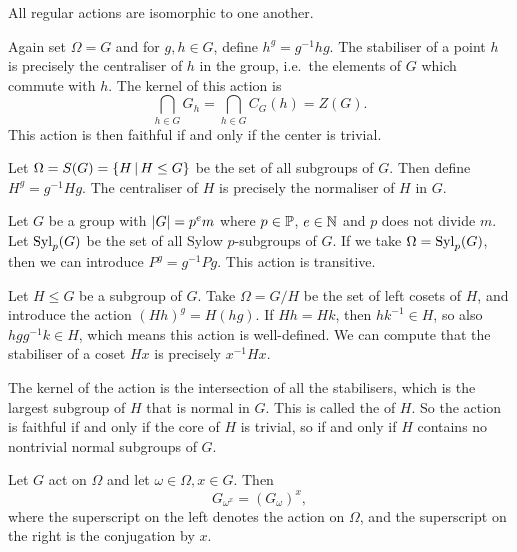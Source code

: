 \begin{remark}
  All regular actions are isomorphic to one another.
\end{remark}

\begin{example}
  Again set $\Omega = G$ and for $g, h \in G$, define $h^g = g^{-1} h g$.
  The stabiliser of a point $h$ is precisely the centraliser of $h$ in the
  group, i.e.~the elements of $G$ which commute with $h$.
  The kernel of this action is
  \[
	\bigcap_{h \in G} G_h = \bigcap_{h \in G} C_G(h) = Z(G).
  \]
  This action is then faithful if and only if the center is trivial.
\end{example}

\begin{example}
  Let $\Omega = S(G) = \{ H \,|\, H \le G \}$ be the set of all subgroups of
  $G$.
  Then define $H^g = g^{-1} H g$.
  The centraliser of $H$ is precisely the normaliser of $H$ in $G$.
\end{example}

\begin{example}
  Let $G$ be a group with $\left| G \right| = p^e m$ where $p \in \mathbb{P}$, $e \in \mathbb{N}$ and
  $p$ does not divide $m$.
  Let $\operatorname{Syl}_p(G)$ be the set of all Sylow $p$-subgroups of $G$.
  If we take $\Omega = \operatorname{Syl}_p(G)$, then we can introduce $P^g = g^{-1} P g$.
  This action is transitive.
\end{example}

\begin{example}
  Let $H \le G$ be a subgroup of $G$.
  Take $\Omega = G / H$ be the set of left cosets of $H$, and introduce the
  action $(Hh)^g = H(hg)$.
  If $Hh = Hk$, then $hk^{-1} \in H$, so also $hgg^{-1}k \in H$, which means
  this action is well-defined.
  We can compute that the stabiliser of a coset $H x$ is precisely $x^{-1} H x$.

  The kernel of the action is the intersection of all the stabilisers, which is
  the largest subgroup of $H$ that is normal in $G$.
  This is called the  of $H$.
  So the action is faithful if and only if the core of $H$ is trivial, so if and
  only if $H$ contains no nontrivial normal subgroups of $G$.
\end{example}

\begin{lemma}
  Let $G$ act on $\Omega$ and let $\omega \in \Omega, x \in G$.
  Then
  \[
	G_{\omega^x} = (G_\omega)^x,
  \]
  where the superscript on the left denotes the action on $\Omega$, and the
  superscript on the right is the conjugation by $x$.
\end{lemma}

